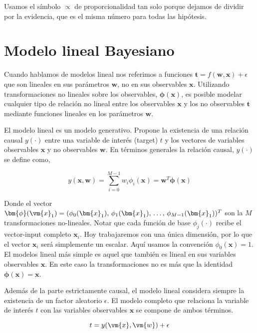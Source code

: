 \documentclass[a4paper,10pt]{article}
\begin{document}
Usamos el s\'imbolo $\propto$ de proporcionalidad tan solo porque dejamos de dividir por la evidencia, que es el misma n\'umero para todas las hip\'otesis.

\section{Modelo lineal Bayesiano} \label{sec:lineal}

Cuando hablamos de modelos lineal nos referimos a funciones $\bm{t}= f(\bm{w},\bm{x}) + \epsilon $ que son lineales en sus parámetros $\bm{w}$, no en sus observables $\bm{x}$.
Utilizando transformaciones no lineales sobre los observables, $\bm{\phi}(\bm{x})$, es posible modelar cualquier tipo de relaci\'on no lineal entre los observables $\bm{x}$ y los no observables $\bm{t}$ mediante funciones lineales en los par\'ametros $\bm{w}$.

\vspace{0.3cm}

El modelo lineal es un modelo generativo. Propone la existencia de una relaci\'on causal $y(\cdot)$ entre una variable de inter\'es (target) $t$ y los vectores de variables observables $\bm{x}$ y no observables $\bm{w}$.
En t\'erminos generales la relaci\'on causal, $y(\cdot)$ se define como,

\begin{equation}
y(\bm{x},\bm{w}) = \sum_{i=0}^{M-1} w_i \phi_i(\bm{x}) = \bm{w}^T \bm{\phi}(\bm{x})
\end{equation}
 
Donde el vector $\bm{\phi}(\vm{x}_1) = ( \phi_0(\bm{x}_1), \, \phi_1(\bm{x}_1) , \, \dots , \, \phi_{M-1}(\bm{x}_1) )^T$ son la $M$ transformaciones no-lineales.
Notar que cada funci\'on de base $\phi_j(\cdot)$ recibe el vector-input completo $\bm{x}_i$.
Hoy trabajaremos con una \'unica dimensi\'on, por lo que el vector $\bm{x}_i$ ser\'a simplemente un escalar.
Aqu\'i usamos la convenci\'on $\phi_0(\bm{x})=1$.
El modelos lineal m\'as simple es aquel que tambi\'en es lineal en sus variables observables $\bm{x}$.
En este caso la transformaciones no es m\'as que la identidad $\bm{\phi}(\bm{x})=\bm{x}$.

Adem\'as de la parte estrictamente causal, el modelo lineal considera siempre la existencia de un factor aleatorio $\epsilon$.
El modelo completo que relaciona la variable de inter\'es $t$ con las variables observables $\bm{x}$ se compone de ambos t\'erminos.

\begin{equation}
 t = y(\vm{x},\vm{w}) + \epsilon
\end{equation}
 
\end{document}
